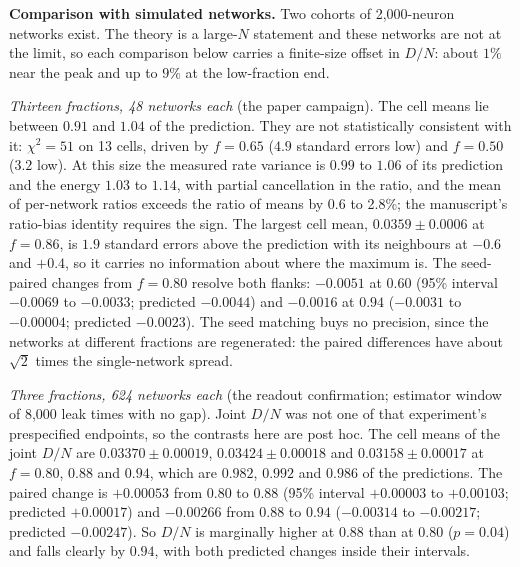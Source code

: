 \documentclass[11pt]{article}
\begin{document}
\textbf{Comparison with simulated networks.} Two cohorts of 2{,}000-neuron networks exist. The theory is a large-$N$ statement and these networks are not at the limit, so each comparison below carries a finite-size offset in $D/N$: about $1\%$ near the peak and up to $9\%$ at the low-fraction end.

\emph{Thirteen fractions, 48 networks each} (the paper campaign). The cell means lie between $0.91$ and $1.04$ of the prediction. They are not statistically consistent with it: $\chi^2=51$ on 13 cells, driven by $f=0.65$ ($4.9$ standard errors low) and $f=0.50$ ($3.2$ low). At this size the measured rate variance is $0.99$ to $1.06$ of its prediction and the energy $1.03$ to $1.14$, with partial cancellation in the ratio, and the mean of per-network ratios exceeds the ratio of means by 0.6 to 2.8\%; the manuscript's ratio-bias identity requires the sign. The largest cell mean, $0.0359\pm0.0006$ at $f=0.86$, is $1.9$ standard errors above the prediction with its neighbours at $-0.6$ and $+0.4$, so it carries no information about where the maximum is. The seed-paired changes from $f=0.80$ resolve both flanks: $-0.0051$ at $0.60$ (95\% interval $-0.0069$ to $-0.0033$; predicted $-0.0044$) and $-0.0016$ at $0.94$ ($-0.0031$ to $-0.00004$; predicted $-0.0023$). The seed matching buys no precision, since the networks at different fractions are regenerated: the paired differences have about $\sqrt2$ times the single-network spread.

\emph{Three fractions, 624 networks each} (the readout confirmation; estimator window of 8{,}000 leak times with no gap). Joint $D/N$ was not one of that experiment's prespecified endpoints, so the contrasts here are post hoc. The cell means of the joint $D/N$ are $0.03370\pm0.00019$, $0.03424\pm0.00018$ and $0.03158\pm0.00017$ at $f=0.80$, $0.88$ and $0.94$, which are $0.982$, $0.992$ and $0.986$ of the predictions. The paired change is $+0.00053$ from $0.80$ to $0.88$ (95\% interval $+0.00003$ to $+0.00103$; predicted $+0.00017$) and $-0.00266$ from $0.88$ to $0.94$ ($-0.00314$ to $-0.00217$; predicted $-0.00247$). So $D/N$ is marginally higher at $0.88$ than at $0.80$ ($p=0.04$) and falls clearly by $0.94$, with both predicted changes inside their intervals.
\end{document}
